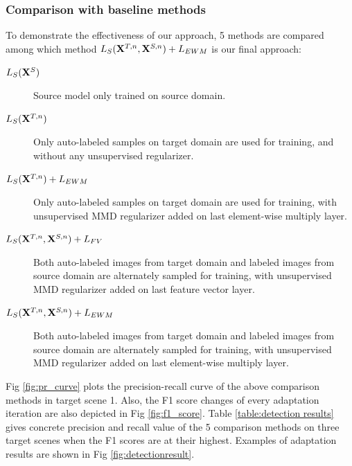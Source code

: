 \documentclass[runningheads]{llncs}
\begin{document}
\subsubsection{Comparison with baseline methods}
To demonstrate the effectiveness of our approach, 5 methods are compared among which method $L_{S}({\bf X}^{T,n},{\bf X}^{S,n})+L_{EWM}$ is our final approach:
\begin{description}
  \item[$L_{S}({\bf X}^{S})$] Source model only trained on source domain.
  \item[$L_{S}({\bf X}^{T,n})$] Only auto-labeled samples on target domain are used for training, and without any unsupervised regularizer.
  \item[$L_{S}({\bf X}^{T,n})+L_{EWM}$] Only auto-labeled samples on target domain are used for training, with unsupervised MMD regularizer added on last element-wise multiply layer.
  \item[$L_{S}({\bf X}^{T,n},{\bf X}^{S,n})+L_{FV}$\cite{tzeng2014deep}] Both auto-labeled images from target domain and labeled images from source domain are alternately sampled for training, with unsupervised MMD regularizer added on last feature vector layer.
  \item[$L_{S}({\bf X}^{T,n},{\bf X}^{S,n})+L_{EWM}$] Both auto-labeled images from target domain and labeled images from source domain are alternately sampled for training, with unsupervised MMD regularizer added on last element-wise multiply layer.
\end{description}
Fig \ref{fig:pr_curve} plots the precision-recall curve of the above comparison methods in target scene 1. Also, the F1 score changes of every adaptation iteration are also depicted in Fig \ref{fig:f1_score}. Table \ref{table:detection results} gives concrete precision and recall value of the 5 comparison methods on three target scenes when the F1 scores are at their highest. Examples of adaptation results are shown in Fig \ref{fig:detectionresult}.
\end{document}
